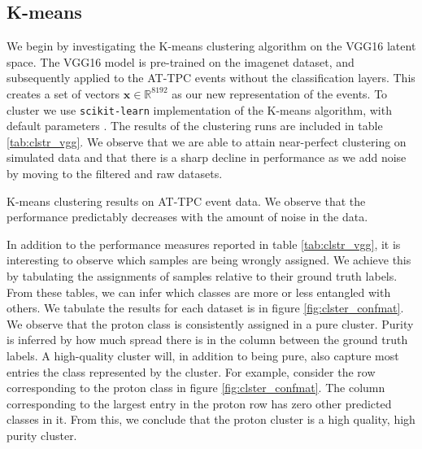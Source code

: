 \documentclass[review,number,sort&compress]{elsarticle}
\newcommand{\R}{\mathbb{R}}
\begin{document}
\subsection{K-means}

We begin by investigating the K-means clustering algorithm on the VGG16 latent space. The VGG16 model is pre-trained on the imagenet dataset, and subsequently applied to the AT-TPC events without the classification layers. This creates a set of vectors $\boldsymbol{x} \in \R^{8192}$ as our new representation of the events. To cluster we use \lstinline{scikit-learn} implementation of the K-means algorithm, with default parameters \cite{Pedregosa2011}. The results of the clustering runs are included in table \ref{tab:clstr_vgg}. We observe that we are able to attain near-perfect clustering on simulated data and that there is a sharp decline in performance as we add noise by moving to the filtered and raw datasets. 


\begin{table}[H]
\centering 
\caption[K-means on pre-trained model]{K-means clustering results on AT-TPC event data. We observe that the performance predictably decreases with the amount of noise in the data.}\label{tab:clstr_vgg}

\end{table}

In addition to the performance measures reported in table \ref{tab:clstr_vgg}, it is interesting to observe which samples are being wrongly assigned. We achieve this by tabulating the assignments of samples relative to their ground truth labels. From these tables, we can infer which classes are more or less entangled with others. We tabulate the results for each dataset is in figure \ref{fig:clster_confmat}. We observe that the proton class is consistently assigned in a pure cluster. Purity is inferred by how much spread there is in the column between the ground truth labels. A high-quality cluster will, in addition to being pure, also capture most entries the class represented by the cluster. For example, consider the row corresponding to the proton class in figure \ref{fig:clster_confmat}. The column corresponding to the largest entry in the proton row has zero other predicted classes in it. From this, we conclude that the proton cluster is a high quality, high purity cluster. 
\end{document}
